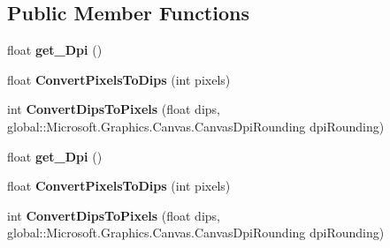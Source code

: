 \subsection*{Public Member Functions}
\begin{DoxyCompactItemize}
\item 
\mbox{\label{interface_microsoft_1_1_graphics_1_1_canvas_1_1_i_canvas_resource_creator_with_dpi_aab3b8b31dd168453a87bccde38d285c3}} 
float {\bfseries get\+\_\+\+Dpi} ()
\item 
\mbox{\label{interface_microsoft_1_1_graphics_1_1_canvas_1_1_i_canvas_resource_creator_with_dpi_ab822057561c60e367090d8542a623109}} 
float {\bfseries Convert\+Pixels\+To\+Dips} (int pixels)
\item 
\mbox{\label{interface_microsoft_1_1_graphics_1_1_canvas_1_1_i_canvas_resource_creator_with_dpi_ae420e3ef2a8d6cc42c2d736970520431}} 
int {\bfseries Convert\+Dips\+To\+Pixels} (float dips, global\+::\+Microsoft.\+Graphics.\+Canvas.\+Canvas\+Dpi\+Rounding dpi\+Rounding)
\item 
\mbox{\label{interface_microsoft_1_1_graphics_1_1_canvas_1_1_i_canvas_resource_creator_with_dpi_aab3b8b31dd168453a87bccde38d285c3}} 
float {\bfseries get\+\_\+\+Dpi} ()
\item 
\mbox{\label{interface_microsoft_1_1_graphics_1_1_canvas_1_1_i_canvas_resource_creator_with_dpi_ab822057561c60e367090d8542a623109}} 
float {\bfseries Convert\+Pixels\+To\+Dips} (int pixels)
\item 
\mbox{\label{interface_microsoft_1_1_graphics_1_1_canvas_1_1_i_canvas_resource_creator_with_dpi_ae420e3ef2a8d6cc42c2d736970520431}} 
int {\bfseries Convert\+Dips\+To\+Pixels} (float dips, global\+::\+Microsoft.\+Graphics.\+Canvas.\+Canvas\+Dpi\+Rounding dpi\+Rounding)
\item 

\end{DoxyCompactItemize}
